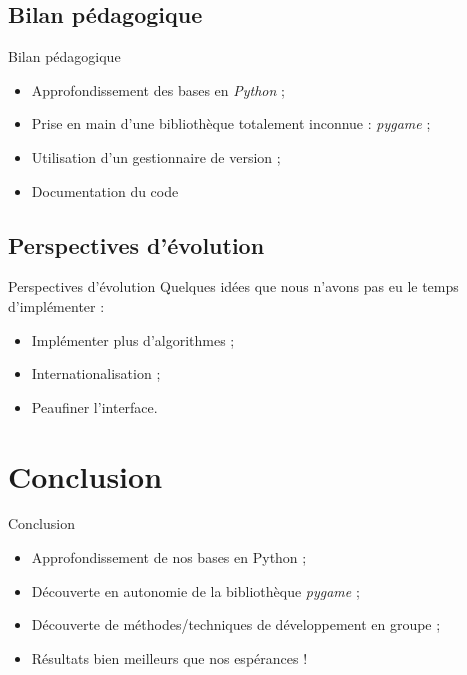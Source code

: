 \documentclass{beamer}
\begin{document}
\subsection{Bilan pédagogique}
	\begin{frame}{Bilan pédagogique}
		\begin{itemize}
		\setlength{\itemsep}{0.3cm}
			\item Approfondissement des bases en \emph{Python} ;
			\item Prise en main d'une bibliothèque totalement inconnue :
			\emph{pygame} ;
			\vspace{1cm}
			\item Utilisation d'un gestionnaire de version ;
			\item Documentation du code
		\end{itemize}
	\end{frame}
\subsection{Perspectives d'évolution}
	\begin{frame}{Perspectives d'évolution}
		Quelques idées que nous n'avons pas eu le temps d'implémenter :
		\begin{itemize}
		\setlength{\itemsep}{0.3cm}
			\item Implémenter plus d'algorithmes ;
			\item Internationalisation ;
			\item Peaufiner l'interface.
		\end{itemize}
	\end{frame}

\section{Conclusion}
	\begin{frame}{Conclusion}
		\begin{itemize}
		\setlength{\itemsep}{0.4cm}
			\item Approfondissement de nos bases en Python ;
			\item Découverte en autonomie de la bibliothèque \emph{pygame} ;
			\item Découverte de méthodes/techniques de développement en groupe ;
			\item Résultats bien meilleurs que nos espérances !
		\end{itemize}
	\end{frame}
\end{document}

